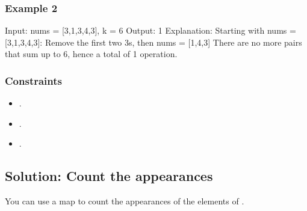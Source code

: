 \documentclass[letterpaper,12pt,english]{book}
\begin{document}
\subsubsection{Example 2}
\label{\detokenize{Counting/1679_Max_Number_of_K-Sum_Pairs:example-2}}
\begin{sphinxVerbatim}[commandchars=\\\{\}]
Input: nums = [3,1,3,4,3], k = 6
Output: 1
Explanation: Starting with nums = [3,1,3,4,3]:
\PYGZhy{} Remove the first two 3\PYGZsq{}s, then nums = [1,4,3]
There are no more pairs that sum up to 6, hence a total of 1 operation.
\end{sphinxVerbatim}


\subsubsection{Constraints}
\label{\detokenize{Counting/1679_Max_Number_of_K-Sum_Pairs:constraints}}\begin{itemize}
\item {} 
\sphinxAtStartPar
{}.

\item {} 
\sphinxAtStartPar
{}.

\item {} 
\sphinxAtStartPar
{}.

\end{itemize}


\subsection{Solution: Count the appearances}
\label{\detokenize{Counting/1679_Max_Number_of_K-Sum_Pairs:solution-count-the-appearances}}
\sphinxAtStartPar
You can use a map to count the appearances of the elements of .
\end{document}
